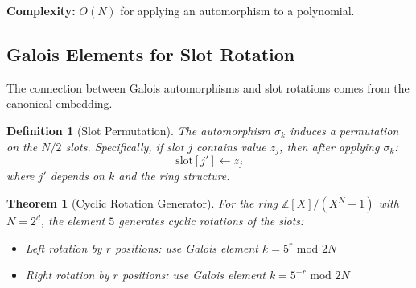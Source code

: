 \documentclass[11pt,a4paper]{article}
\newtheorem{definition}{Definition}
\newtheorem{theorem}{Theorem}
\newcommand{\Z}{\mathbb{Z}}
\newcommand{\bmod}{\text{ mod }}
\begin{document}
\textbf{Complexity:} $O(N)$ for applying an automorphism to a polynomial.

\subsection{Galois Elements for Slot Rotation}

The connection between Galois automorphisms and slot rotations comes from the canonical embedding.

\begin{definition}[Slot Permutation]
The automorphism $\sigma_k$ induces a permutation on the $N/2$ slots. Specifically, if slot $j$ contains value $z_j$, then after applying $\sigma_k$:
\[
\text{slot}[j'] \gets z_j
\]
where $j'$ depends on $k$ and the ring structure.
\end{definition}

\begin{theorem}[Cyclic Rotation Generator]
For the ring $\Z[X]/(X^N + 1)$ with $N = 2^d$, the element $5$ generates cyclic rotations of the slots:
\begin{itemize}
    \item Left rotation by $r$ positions: use Galois element $k = 5^r \bmod 2N$
    \item Right rotation by $r$ positions: use Galois element $k = 5^{-r} \bmod 2N$
\end{itemize}
\end{theorem}
\end{document}
